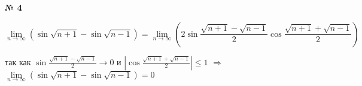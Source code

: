 \documentclass{article}
\begin{document}
\textbf{№ 4} 

\begingroup

$$ \lim\limits_{n\to \infty} \left( \sin{\sqrt{n+1}} - \sin{\sqrt{n-1}} \right) 
= \lim\limits_{n\to \infty} \left( 2 \sin{\frac{\sqrt{n+1} - \sqrt{n-1}}{2}} \cos{\frac{\sqrt{n+1} + \sqrt{n-1}}{2}} \right)$$

так как $\sin{\frac{\sqrt{n+1} - \sqrt{n-1}}{2}} \to 0$ и $ \left| \cos{\frac{\sqrt{n+1} + \sqrt{n-1}}{2}} \right| \leq 1$ $\Rightarrow$ $\lim\limits_{n\to \infty} \left( \sin{\sqrt{n+1}} - \sin{\sqrt{n-1}} \right) = 0$



\endgroup
\end{document}

